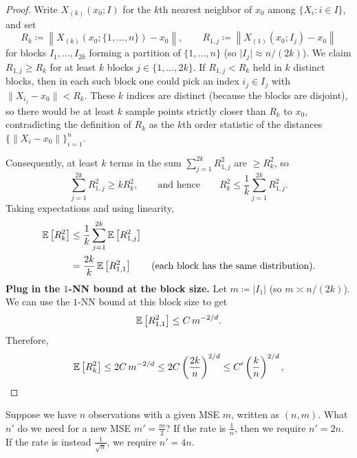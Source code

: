 \begin{proof}

	Write $X_{(k)}(x_0;I)$ for the $k$th nearest neighbor of $x_0$ among $\{X_i:i\in I\}$, and set
	\[
		R_k \coloneqq \left\|X_{(k)}(x_0;\{1,\ldots,n\})-x_0\right\|, 
		\qquad 
		R_{1,j} \coloneqq \left\|X_{(1)}(x_0;I_j)-x_0\right\|
	\]
	for blocks $I_1,\ldots,I_{2k}$ forming a partition of $\{1,\ldots,n\}$ (so $\lvert I_j\rvert \approx n/(2k)$).
	We claim $R_{1,j} \ge R_k$ for at least $k$ blocks $j\in\{1,\ldots,2k\}$.
	If $R_{1,j} < R_k$ held in $k$ distinct blocks, then in each such block one could pick an index
	$i_j\in I_j$ with $\|X_{i_j}-x_0\| < R_k$. These $k$ indices are distinct (because the blocks are disjoint),
	so there would be at least $k$ sample points strictly closer than $R_k$ to $x_0$, contradicting the
	definition of $R_k$ as the $k$th order statistic of the distances $\{\|X_i-x_0\|\}_{i=1}^n$.

	Consequently, at least $k$ terms in the sum $\sum_{j=1}^{2k} R_{1,j}^2$ are $\ge R_k^2$, so
	\[
		\sum_{j=1}^{2k} R_{1,j}^2 \ge k R_k^2,
		\qquad\text{and hence}\qquad
		R_k^2 \le \frac{1}{k}\sum_{j=1}^{2k} R_{1,j}^2.
	\]
	Taking expectations and using linearity,
	\begin{align*}
		\mathbb{E}\left[R_k^2\right]
		&\le \frac{1}{k}\sum_{j=1}^{2k} \mathbb{E}\left[R_{1,j}^2\right] \\
		&= \frac{2k}{k}\,\mathbb{E}\left[R_{1,1}^2\right]
		\qquad\text{(each block has the same distribution).}
	\end{align*}
	\noindent\textbf{Plug in the $1$-NN bound at the block size.}
	Let $m \coloneqq \lvert I_1\rvert$ (so $m \asymp n/(2k)$). We can use the $1$-NN bound at this block size to get
	\[
		\mathbb{E}\left[R_{1,1}^2\right] \le C\, m^{-2/d}.
	\]
	Therefore,
	\[
		\mathbb{E}\left[R_k^2\right]
		\le 2C\, m^{-2/d}
		\le 2C\left(\frac{2k}{n}\right)^{2/d}
		\le C'\left(\frac{k}{n}\right)^{2/d},
	\]

\end{proof}

\begin{remark}	Suppose we have $n$ observations with a given MSE $m$, written as $(n,m)$. What $n'$ do we need for a new MSE $m' = \frac{m}{2}$? If the rate is $\frac{1}{n}$, then we require $n' = 2n$. If the rate is instead $\frac{1}{\sqrt{n} }$, we require $n' = 4n$.
\end{remark}

